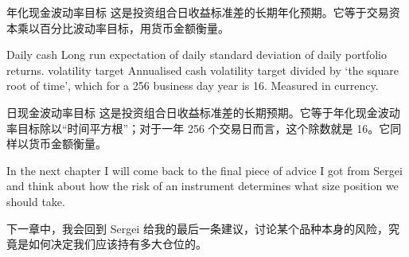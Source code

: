 \begin{chineseblock}年化现金波动率目标 这是投资组合日收益标准差的长期年化预期。它等于交易资本乘以百分比波动率目标，用货币金额衡量。\end{chineseblock}

\bipairgap

\begin{englishblock} Daily cash Long run expectation of daily standard deviation of daily portfolio returns. volatility target Annualised cash volatility target divided by ‘the square root of time', which for a 256 business day year is 16. Measured in currency. \end{englishblock}

\begin{chineseblock}日现金波动率目标 这是投资组合日收益标准差的长期预期。它等于年化现金波动率目标除以“时间平方根”；对于一年 256 个交易日而言，这个除数就是 16。它同样以货币金额衡量。\end{chineseblock}

\bipairgap

\begin{englishblock} In the next chapter I will come back to the final piece of advice I got from Sergei and think about how the risk of an instrument determines what size position we should take. \end{englishblock}

\begin{chineseblock}下一章中，我会回到 Sergei 给我的最后一条建议，讨论某个品种本身的风险，究竟是如何决定我们应该持有多大仓位的。\end{chineseblock}
